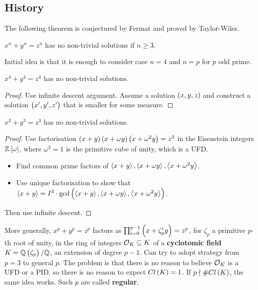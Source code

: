 \subsection{History}

The following theorem is conjectured by Fermat and proved by Taylor-Wiles.

\begin{theorem}
$ x^n + y^n = z^n $ has no non-trivial solutions if $ n \ge 3 $.
\end{theorem}

Initial idea is that it is enough to consider case $ n = 4 $ and $ n = p $ for $ p $ odd prime.

\begin{theorem}[Fermat]
$ x^4 + y^4 = z^4 $ has no non-trivial solutions.
\end{theorem}

\begin{proof}
Use infinite descent argument. Assume a solution $ \br{x, y, z} $ and construct a solution $ \br{x', y', z'} $ that is smaller for some measure.
\end{proof}

\begin{theorem}[Euler]
$ x^3 + y^3 = z^3 $ has no non-trivial solutions.
\end{theorem}

\begin{proof}
Use factorisation $ \br{x + y}\br{x + \omega y}\br{x + \omega^2y} = z^3 $ in the Eisenstein integers $ \Z\sbr{\omega} $, where $ \omega^3 = 1 $ is the primitive cube of unity, which is a UFD.
\begin{itemize}
\item Find common prime factors of $ \left\langle x + y \right\rangle, \left\langle x + \omega y \right\rangle, \left\langle x + \omega^2y \right\rangle $.
\item Use unique factorisation to show that $ \abr{x + y} = I^3 \cdot \gcd\br{\abr{x + y}, \abr{x + \omega y}, \abr{x + \omega^2y}} $.
\end{itemize}
Then use infinite descent.
\end{proof}

More generally, $ x^p + y^p = z^p $ factors as $ \prod_{i = 0}^{p - 1} \br{x + \zeta_p^iy} = z^p $, for $ \zeta_p $ a primitive $ p $-th root of unity, in the ring of integers $ \mathcal{O}_K \subseteq K $ of a \textbf{cyclotomic field} $ K = \Q\br{\zeta_p} / \Q $, an extension of degree $ p - 1 $. Can try to adopt strategy from $ p = 3 $ to general $ p $. The problem is that there is no reason to believe $ \mathcal{O}_K $ is a UFD or a PID, so there is no reason to expect $ Cl\br{K} = 1 $. If $ p \nmid \#Cl\br{K} $, the same idea works. Such $ p $ are called \textbf{regular}.

